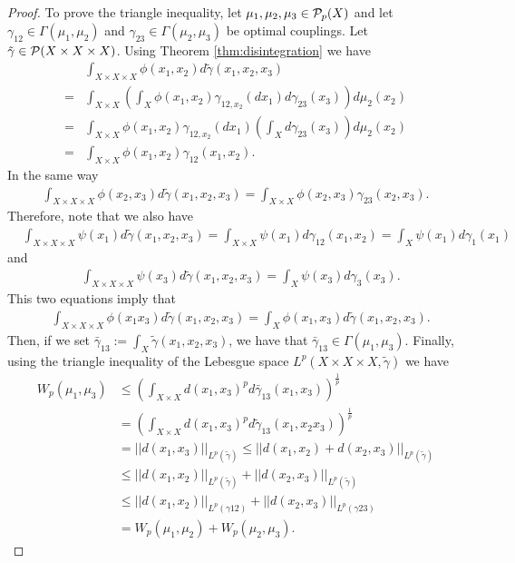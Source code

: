 \begin{proof}
    To prove the triangle inequality, let $ \mu_1, \mu_2, \mu_3 \in \mathcal P_p(X) $ and let $ \gamma_{12} \in \Gamma(\mu_1, \mu_2) $ and $ \gamma_{23} \in \Gamma(\mu_2, \mu_3) $ be optimal couplings. Let $ \tilde \gamma \in \mathcal P(X \times X \times X) $. Using Theorem \ref{thm:disintegration} we have
    \begin{align*}
        &\int_{X \times X \times X} \phi(x_1, x_2) d \tilde \gamma (x_1, x_2, x_3) \\
        = &\int_{X \times X} \left(\int_X \phi(x_1, x_2) \gamma_{12,x_2} (dx_1)  d \gamma_{23}(x_3) \right) d \mu_2(x_2 ) \\
        = &\int_{X \times X} \phi(x_1, x_2) \gamma_{12,x_2} (dx_1) \left(\int_X d \gamma_{23}(x_3)\right) d \mu_2(x_2 ) \\
        = &\int_{X \times X} \phi(x_1, x_2) \gamma_{12}(x_1, x_2).
    \end{align*}
    In the same way
    \begin{align*}
        \int_{X \times X \times X} \phi(x_2, x_3) d \tilde \gamma (x_1, x_2, x_3) = \int_{X \times X} \phi(x_2, x_3) \gamma_{23}(x_2, x_3).
    \end{align*}
    Therefore, note that we also have
    \begin{align*}
        &\int_{X \times X \times X} \psi(x_1) d \tilde \gamma (x_1, x_2, x_3)  
        = \int_{X \times X} \psi(x_1) d \gamma_{12} (x_1, x_2)
        = \int_{X} \psi(x_1) d \gamma_1 (x_1)
    \end{align*}
    and
    \begin{align*}
        &\int_{X \times X \times X} \psi(x_3) d \tilde \gamma (x_1, x_2, x_3)  
        = \int_{X} \psi(x_3) d \gamma_3 (x_3).
    \end{align*}
    This two equations imply that
    \begin{align*}
        &\int_{X \times X \times X} \phi(x_1 x_3) d \tilde \gamma (x_1, x_2, x_3)  
        = \int_{X} \phi(x_1, x_3) d \tilde \gamma (x_1, x_2, x_3).
    \end{align*}
    Then, if we set $ \bar \gamma_{13} := \int_X \tilde \gamma (x_1, x_2, x_3) $, we have that $ \bar \gamma_{13} \in \Gamma(\mu_1, \mu_3)$.
    Finally, using the triangle inequality of the Lebesgue space $ L^p(X \times X \times X, \tilde \gamma) $ we have
    \begin{align*}
        W_p(\mu_1, \mu_3) &\leq \left(\int_{X \times X} d(x_1, x_3)^p d \bar \gamma_{13}(x_1, x_3)\right)^\frac{1}{p} \\
        &= \left(\int_{X \times X} d(x_1, x_3)^p d \tilde \gamma_{13}(x_1, x_2 x_3)\right)^\frac{1}{p} \\
        &= ||d(x_1, x_3)||_{L^p(\tilde \gamma)} \leq ||d(x_1, x_2) + d(x_2, x_3)||_{L^p(\tilde \gamma)} \\
        &\leq ||d(x_1, x_2)||_{L^p(\tilde \gamma)} + ||d(x_2, x_3)||_{L^p(\tilde \gamma)} \\
        &\leq ||d(x_1, x_2)||_{L^p(\gamma{12})} + ||d(x_2, x_3)||_{L^p(\gamma{23})} \\
        &= W_p(\mu_1, \mu_2) + W_p(\mu_2, \mu_3).
    \end{align*}
\end{proof}